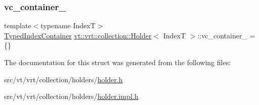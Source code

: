 \subsubsection{\texorpdfstring{vc\+\_\+container\+\_\+}{vc\_container\_}}
{\footnotesize\ttfamily template$<$typename IndexT$>$ \\
\hyperlink{structvt_1_1vrt_1_1collection_1_1_holder_a7f238e98ee835799bc876c180a226b0d}{Typed\+Index\+Container} \hyperlink{structvt_1_1vrt_1_1collection_1_1_holder}{vt\+::vrt\+::collection\+::\+Holder}$<$ IndexT $>$\+::vc\+\_\+container\+\_\+ = \{\}\hspace{0.3cm}{\ttfamily [private]}}



The documentation for this struct was generated from the following files\+:\begin{DoxyCompactItemize}
\item 
src/vt/vrt/collection/holders/\hyperlink{vrt_2collection_2holders_2holder_8h}{holder.\+h}\item 
src/vt/vrt/collection/holders/\hyperlink{vrt_2collection_2holders_2holder_8impl_8h}{holder.\+impl.\+h}\end{DoxyCompactItemize}
